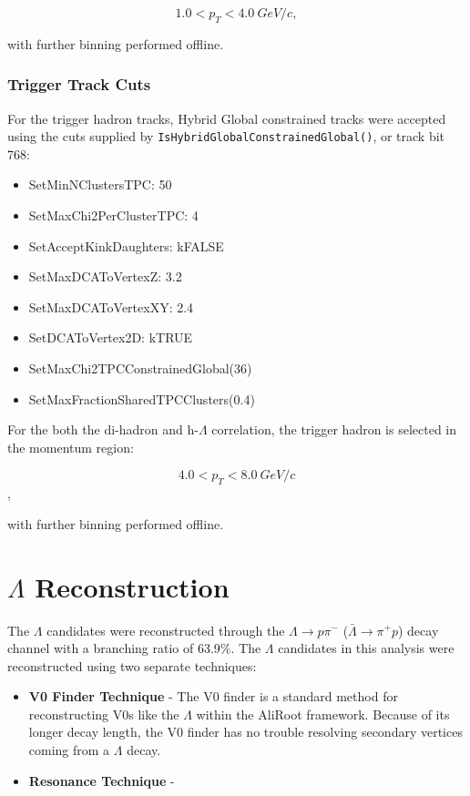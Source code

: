 \documentclass[ALICE,manyauthors]{ALICE_analysis_notes}
\begin{document}
$${1.0 < p_{T} < \SI{4.0}{GeV/c}},$$

with further binning performed offline.

\subsubsection{Trigger Track Cuts}
\label{trigcuts}
For the trigger hadron tracks, Hybrid Global constrained tracks were accepted using the cuts supplied by \texttt{IsHybridGlobalConstrainedGlobal()}, or track bit 768:

\begin{itemize}
	\item SetMinNClustersTPC: 50
	\item SetMaxChi2PerClusterTPC: 4
	\item SetAcceptKinkDaughters: kFALSE
	\item SetMaxDCAToVertexZ: 3.2
	\item SetMaxDCAToVertexXY: 2.4
	\item SetDCAToVertex2D: kTRUE
	\item SetMaxChi2TPCConstrainedGlobal(36)		
	\item SetMaxFractionSharedTPCClusters(0.4)	
\end{itemize}

For the both the di-hadron and h-$\Lambda$ correlation, the trigger hadron is selected in the momentum region:

$${4.0 < p_{T} < \SI{8.0}{GeV/c}}$$,

with further binning performed offline.

\section{$\Lambda$ Reconstruction}

The $\Lambda$ candidates were reconstructed through the $\Lambda \rightarrow p\pi^{-}$ ($\bar{\Lambda} \rightarrow \pi^{+}p$) decay channel with a branching ratio of 63.9\%. The $\Lambda$ candidates in this analysis were reconstructed using two separate techniques:
\begin{itemize}
	\item \textbf{V0 Finder Technique} - The V0 finder is a standard method for reconstructing V0s like the $\Lambda$ within the AliRoot framework. Because of its longer decay length, the V0 finder has no trouble resolving secondary vertices coming from a $\Lambda$ decay.
	\item \textbf{Resonance Technique} - 
 

\end{itemize}
\end{document}
